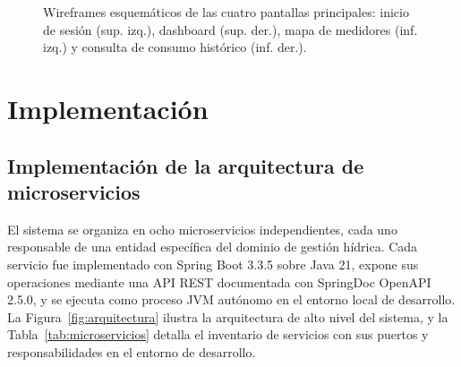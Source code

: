 \documentclass[12pt,a4paper,oneside]{report}
\begin{document}
\begin{figure}[H]
\caption{Wireframes esquemáticos de las cuatro pantallas principales: inicio de sesión (sup. izq.), dashboard (sup. der.), mapa de medidores (inf. izq.) y consulta de consumo histórico (inf. der.).}
\label{fig:wireframes}
\end{figure}

\section{Implementación}\label{sec:implementacion}

\subsection{Implementación de la arquitectura de microservicios}

El sistema se organiza en ocho microservicios independientes, cada uno responsable de una entidad específica del dominio de gestión hídrica. Cada servicio fue implementado con Spring Boot 3.3.5 sobre Java 21, expone sus operaciones mediante una API REST documentada con SpringDoc OpenAPI 2.5.0, y se ejecuta como proceso JVM autónomo en el entorno local de desarrollo. La Figura~\ref{fig:arquitectura} ilustra la arquitectura de alto nivel del sistema, y la Tabla~\ref{tab:microservicios} detalla el inventario de servicios con sus puertos y responsabilidades en el entorno de desarrollo.
\end{document}
